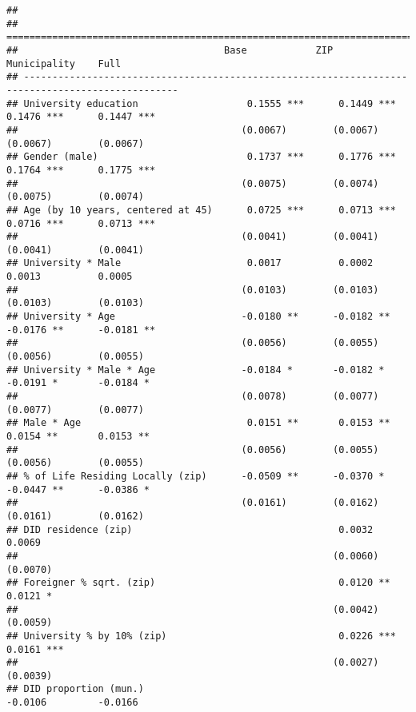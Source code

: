 \documentclass[
]{article}
\begin{document}
\begin{verbatim}
## 
## =================================================================================================
##                                    Base            ZIP             Municipality    Full          
## -------------------------------------------------------------------------------------------------
## University education                   0.1555 ***      0.1449 ***      0.1476 ***      0.1447 ***
##                                       (0.0067)        (0.0067)        (0.0067)        (0.0067)   
## Gender (male)                          0.1737 ***      0.1776 ***      0.1764 ***      0.1775 ***
##                                       (0.0075)        (0.0074)        (0.0075)        (0.0074)   
## Age (by 10 years, centered at 45)      0.0725 ***      0.0713 ***      0.0716 ***      0.0713 ***
##                                       (0.0041)        (0.0041)        (0.0041)        (0.0041)   
## University * Male                      0.0017          0.0002          0.0013          0.0005    
##                                       (0.0103)        (0.0103)        (0.0103)        (0.0103)   
## University * Age                      -0.0180 **      -0.0182 **      -0.0176 **      -0.0181 ** 
##                                       (0.0056)        (0.0055)        (0.0056)        (0.0055)   
## University * Male * Age               -0.0184 *       -0.0182 *       -0.0191 *       -0.0184 *  
##                                       (0.0078)        (0.0077)        (0.0077)        (0.0077)   
## Male * Age                             0.0151 **       0.0153 **       0.0154 **       0.0153 ** 
##                                       (0.0056)        (0.0055)        (0.0056)        (0.0055)   
## % of Life Residing Locally (zip)      -0.0509 **      -0.0370 *       -0.0447 **      -0.0386 *  
##                                       (0.0161)        (0.0162)        (0.0161)        (0.0162)   
## DID residence (zip)                                    0.0032                          0.0069    
##                                                       (0.0060)                        (0.0070)   
## Foreigner % sqrt. (zip)                                0.0120 **                       0.0121 *  
##                                                       (0.0042)                        (0.0059)   
## University % by 10% (zip)                              0.0226 ***                      0.0161 ***
##                                                       (0.0027)                        (0.0039)   
## DID proportion (mun.)                                                 -0.0106         -0.0166    

\end{verbatim}
\end{document}
